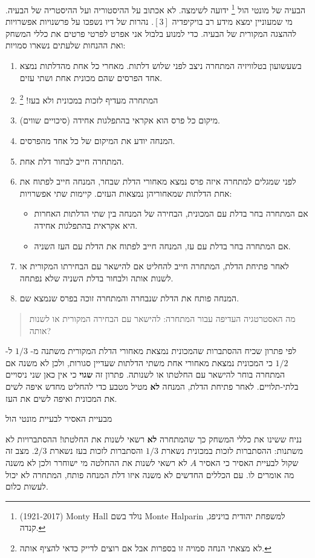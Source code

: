 \documentclass[12pt,a4paper,leqno]{article}
\renewcommand*{\L}[1]{\textenglish{#1}}
\begin{document}
הבעיה של מונטי הול%
\footnote{%
%
\L{(1921-2017) Monty Hall}
נולד בשם 
\L{Monte Halparin}
למשפחת יהודית בויניפג, קנדה.}
ידועה לשימצה. לא אכתוב על ההיסטוריה ועל ההיסטריה של הבעיה. מי שמעוניין ימצא מידע רב בויקיפדיה
$[3]$.
נהרות של דיו נשפכו על פרשנויות אפשרויות לההצגה המקורית של הבעיה. כדי למנוע בלבול אני אפרט לפרטי פרטים את כללי המשחק ואת ההנחות שלעתים נשארו סמויות:
\begin{enumerate}
\item
בשעשועון בטלוויזיה המתחרה ניצב לפני שלוש דלתות. מאחרי כל אחת מהדלתות נמצא אחד הפרסים שהם מכונית אחת ושתי עזים.
\item
המתחרה מעדיף לזכות במכונית ולא בעז!%
\footnote{%
לא מצאתי הנחה סמויה זו בספרות אבל אם רוצים לדייק כדאי להציף אותה.}
\item
מיקום כל פרס הוא אקראי בהתפלגות אחידה (סיכויים שווים).
\item
המנחה יודע את המיקום של כל אחד מהפרסים. 
\item
המתחרה חייב לבחור דלת אחת.
\item
לפני שמגלים למתחרה איזה פרס נמצא מאחורי הדלת שבחר, המנחה חייב לפתוח את אחת הדלתות שמאחוריהן נמצאות העזים. קיימות שתי אפשרויות:
\begin{itemize}
\item
אם המתחרה בחר בדלת עם המכונית, הבחירה של המנחה בין שתי הדלתות האחרות היא אקראית בהתפלגות אחידה.
\item
אם המתחרה בחר בדלת עם עז, המנחה חייב לפתוח את הדלת עם העז השניה.
\end{itemize}
\item
לאחר פתיחת הדלת, המתחרה חייב להחליט אם להישאר עם הבחירתו המקורית או לשנות אותה ולבחור בדלת השניה שלא נפתחה.
\item
המנחה פותח את הדלת שנבחרה והמתחרה זוכה בפרס שנמצא שם.
\end{enumerate}
\begin{quote}
מה האסטרטגיה העדיפה עבור המתחרה: להישאר עם הבחירה המקורית או לשנות אותה?
\end{quote}
לפי פתרון שכיח ההסתברות שהמכונית נמצאת מאחורי הדלת המקורית משתנה מ-%
$1/3$
ל-%
$1/2$
כי המכונית נמצאת מאחורי אחת משתי הדלתות שעדיין סגורות, ולכן לא משנה אם המתחרה בוחר להישאר עם החלטתו או לשנותה. פתרון זה 
\textbf{שגוי}
כי אין כאן שני ניסויים בלתי-תלויים. לאחר פתיחת הדלת, המנחה
\textbf{לא}
מטיל מטבע כדי להחליט מחדש איפה לשים את המכונית ואיפה לשים את העז.

{\bigskip\Large 
מבעיית האסיר לבעיית מונטי הול}

נניח ששינו את כללי המשחק כך שהמתחרה
\textbf{לא}
רשאי לשנות את החלטתו! ההסתברויות לא משתנות: ההסתברות לזכות במכונית נשארת
$1/3$
והסתברות לזכות בעז נשארת
$2/3$.
מצב זה שקול לבעיית האסיר כי האסיר 
$A$
לא רשאי לשנות את ההחלטה מי ישוחרר ולכן לא משנה מה אומרים לו. עם הכללים החדשים לא משנה איזו דלת המנחה פותח, המתחרה לא יכול לעשות כלום.
\end{document}

